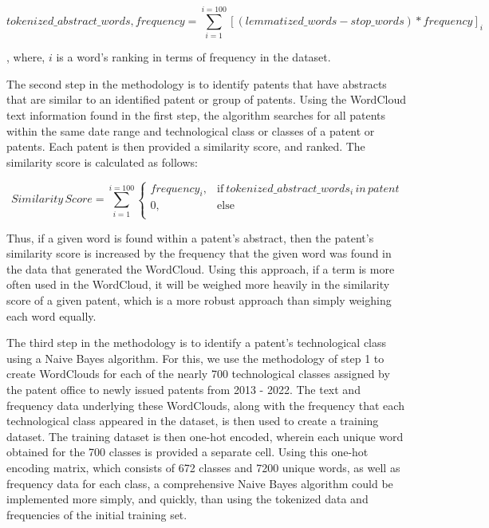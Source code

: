 \documentclass{article}
\begin{document}
\begin{equation}
tokenized\_abstract\_words, frequency = \sum_{i=1}^{i=100} [(lemmatized\_words - stop\_words) * frequency]_i
\end{equation}

, where, \begin{math}i\end{math} is a word’s ranking in terms of frequency in the dataset.

The second step in the methodology is to identify patents that have abstracts that are similar to an identified patent or group of patents.  Using the WordCloud text information found in the first step, the algorithm searches for all patents within the same date range and technological class or classes of a patent or patents.  Each patent is then provided a similarity score, and ranked.  The similarity score is calculated as follows:

\begin{equation}
  Similarity\, Score = \sum_{i=1}^{i=100}
    \begin{cases}
      frequency_i, & \text{if}\ tokenized\_abstract\_words_i\, in\, patent \\
      0, & \text{else} \\
    \end{cases}
\end{equation}

Thus, if a given word is found within a patent’s abstract, then the patent’s similarity score is increased by the frequency that the given word was found in the data that generated the WordCloud.  Using this approach, if a term is more often used in the WordCloud, it will be weighed more heavily in the similarity score of a given patent, which is a more robust approach than simply weighing each word equally.

The third step in the methodology is to identify a patent’s technological class using a Naive Bayes algorithm.  For this, we use the methodology of step 1 to create WordClouds for each of the nearly 700 technological classes assigned by the patent office to newly issued patents from 2013 - 2022.  The text and frequency data underlying these WordClouds, along with the frequency that each technological class appeared in the dataset, is then used to create a training dataset.  The training dataset is then one-hot encoded, wherein each unique word obtained for the 700 classes is provided a separate cell.  Using this one-hot encoding matrix, which consists of 672 classes and 7200 unique words, as well as frequency data for each class, a comprehensive Naive Bayes algorithm could be implemented more simply, and quickly, than using the tokenized data and frequencies of the initial training set.
\end{document}
